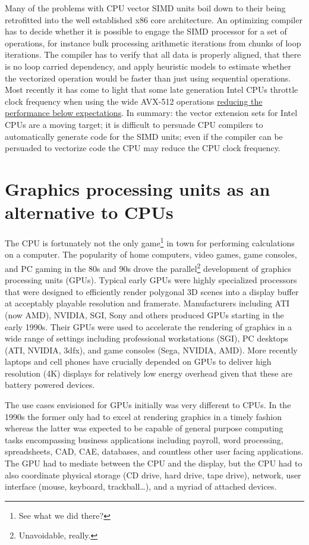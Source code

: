 Many of the problems with CPU vector SIMD units boil down to their being retrofitted into the well established x86 core architecture. An optimizing compiler has to decide whether it is possible to engage the SIMD processor for a set of operations, for instance bulk processing arithmetic iterations from chunks of loop iterations. The compiler has to verify that all data is properly aligned, that there is no loop carried dependency, and apply heuristic models to estimate whether the vectorized operation would be faster than just using sequential operations. Most recently it has come to light that some late generation Intel CPUs throttle clock frequency when using the wide AVX-512 operations \href{https://blog.cloudflare.com/on-the-dangers-of-intels-frequency-scaling/}{reducing the performance below expectations}. In summary: the vector extension sets for Intel CPUs are a moving target; it is difficult to persuade CPU compilers to automatically generate code for the SIMD units; even if the compiler can be persuaded to vectorize code the CPU may reduce the CPU clock frequency.

\section{Graphics processing units as an alternative to CPUs}

The CPU is fortunately not the only game\footnote{See what we did there?} in town for performing calculations on a computer. The popularity of home computers, video games, game consoles, and PC gaming in the 80s and 90s drove the parallel\footnote{Unavoidable, really.} development of graphics processing units (GPUs). Typical early GPUs were highly specialized processors that were designed to efficiently render polygonal 3D scenes into a display buffer at acceptably playable resolution and framerate. Manufacturers including ATI (now AMD), NVIDIA, SGI, Sony and others produced GPUs starting in the early 1990s. Their GPUs were used to accelerate the rendering of graphics in a wide range of settings including professional workstations (SGI), PC desktops (ATI, NVIDIA, 3dfx), and game consoles (Sega, NVIDIA, AMD). More recently laptops and cell phones have crucially depended on GPUs to deliver high resolution (4K) displays for relatively low energy overhead given that these are battery powered devices.

The use cases envisioned for GPUs initially was very different to CPUs. In the 1990s the former only had to excel at rendering graphics in a timely fashion whereas the latter was expected to be capable of general purpose computing tasks encompassing business applications including payroll, word processing, spreadsheets, CAD, CAE, databases, and countless other user facing applications.  The GPU had to mediate between the CPU and the display, but the CPU had to also coordinate physical storage (CD drive, hard drive, tape drive), network, user interface (mouse, keyboard, trackball\ldots), and a myriad of attached devices.  


